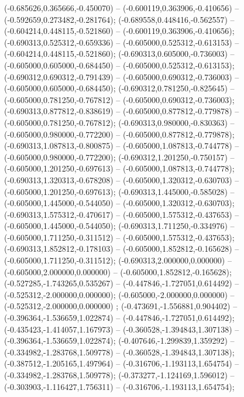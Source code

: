  (-0.685626,0.365666,-0.450070) -- (-0.600119,0.363906,-0.410656) -- (-0.592659,0.273482,-0.281764);
 (-0.689558,0.448416,-0.562557) -- (-0.604214,0.448115,-0.521860) -- (-0.600119,0.363906,-0.410656);
 (-0.690313,0.525312,-0.659336) -- (-0.605000,0.525312,-0.613153) -- (-0.604214,0.448115,-0.521860);
 (-0.690313,0.605000,-0.736003) -- (-0.605000,0.605000,-0.684450) -- (-0.605000,0.525312,-0.613153);
 (-0.690312,0.690312,-0.791439) -- (-0.605000,0.690312,-0.736003) -- (-0.605000,0.605000,-0.684450);
 (-0.690312,0.781250,-0.825645) -- (-0.605000,0.781250,-0.767812) -- (-0.605000,0.690312,-0.736003);
 (-0.690313,0.877812,-0.838619) -- (-0.605000,0.877812,-0.779878) -- (-0.605000,0.781250,-0.767812);
 (-0.690313,0.980000,-0.830363) -- (-0.605000,0.980000,-0.772200) -- (-0.605000,0.877812,-0.779878);
 (-0.690313,1.087813,-0.800875) -- (-0.605000,1.087813,-0.744778) -- (-0.605000,0.980000,-0.772200);
 (-0.690312,1.201250,-0.750157) -- (-0.605000,1.201250,-0.697613) -- (-0.605000,1.087813,-0.744778);
 (-0.690313,1.320313,-0.678208) -- (-0.605000,1.320312,-0.630703) -- (-0.605000,1.201250,-0.697613);
 (-0.690313,1.445000,-0.585028) -- (-0.605000,1.445000,-0.544050) -- (-0.605000,1.320312,-0.630703);
 (-0.690313,1.575312,-0.470617) -- (-0.605000,1.575312,-0.437653) -- (-0.605000,1.445000,-0.544050);
 (-0.690313,1.711250,-0.334976) -- (-0.605000,1.711250,-0.311512) -- (-0.605000,1.575312,-0.437653);
 (-0.690313,1.852812,-0.178103) -- (-0.605000,1.852812,-0.165628) -- (-0.605000,1.711250,-0.311512);
 (-0.690313,2.000000,0.000000) -- (-0.605000,2.000000,0.000000) -- (-0.605000,1.852812,-0.165628);
 (-0.527285,-1.743265,0.535267) -- (-0.447846,-1.727051,0.614492) -- (-0.525312,-2.000000,0.000000);
 (-0.605000,-2.000000,0.000000) -- (-0.525312,-2.000000,0.000000) ;
 (-0.473691,-1.556881,0.904402) -- (-0.396364,-1.536659,1.022874) -- (-0.447846,-1.727051,0.614492);
 (-0.435423,-1.414057,1.167973) -- (-0.360528,-1.394843,1.307138) -- (-0.396364,-1.536659,1.022874);
 (-0.407646,-1.299839,1.359292) -- (-0.334982,-1.283768,1.509778) -- (-0.360528,-1.394843,1.307138);
 (-0.387512,-1.205165,1.497964) -- (-0.316706,-1.193113,1.654754) -- (-0.334982,-1.283768,1.509778);
 (-0.373277,-1.124169,1.596012) -- (-0.303903,-1.116427,1.756311) -- (-0.316706,-1.193113,1.654754);
